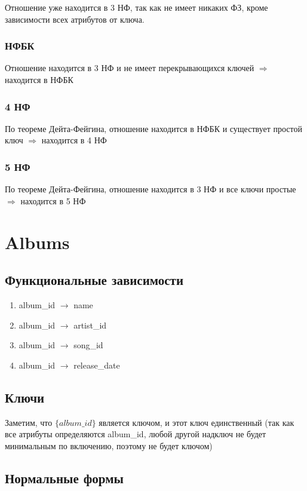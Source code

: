 \documentclass{article}
\begin{document}
Отношение уже находится в 3 НФ, так как не имеет никаких ФЗ, кроме зависимости всех атрибутов от ключа.

\subsubsection{НФБК}

Отношение находится в 3 НФ и не имеет перекрывающихся ключей $\Rightarrow$ находится в НФБК

\subsubsection{4 НФ}

По теореме Дейта-Фейгина, отношение находится в НФБК и существует простой ключ $\Rightarrow$ находится в 4 НФ

\subsubsection{5 НФ}

По теореме Дейта-Фейгина, отношение находится в 3 НФ и все ключи простые $\Rightarrow$ находится в 5 НФ

\section{Albums}

\subsection{Функциональные зависимости}
\begin{enumerate}
	\item album\_id $\rightarrow$ name
	\item album\_id $\rightarrow$ artist\_id
	\item album\_id $\rightarrow$ song\_id
	\item album\_id $\rightarrow$ release\_date
\end{enumerate}

\subsection{Ключи}
Заметим, что $\{album\_id\}$ является ключом, и этот ключ единственный (так как все атрибуты определяются album\_id, любой другой надключ не будет минимальным по включению, поэтому не будет ключом)

\subsection{Нормальные формы}
\end{document}
